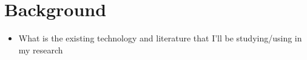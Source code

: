 \section{Background}
\begin{itemize}
    \item What is the existing technology and literature that I'll be studying/using in my research
\end{itemize}

